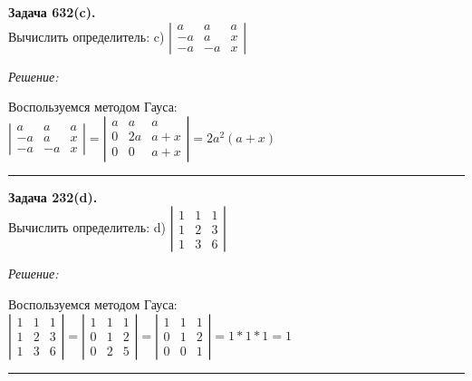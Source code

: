 \documentclass[a4paper, 12pt]{article}
\newenvironment{problem}[2][Задача]
    { \begin{mdframed}[backgroundcolor=gray!10] \textbf{#1 #2.} \\}
    {  \end{mdframed}}
\newenvironment{solution}
    {\textit{Решение: }}
    {\noindent\rule{7in}{1.5pt}}
\begin{document}
\begin{problem}{632(c)}
Вычислить определитель:
c) $\left| \begin{array}{rrr}a & a & a \\ -a & a & x\\-a & -a & x \end{array} \right|$
\end{problem}
\begin{solution}

Воспользуемся методом Гауса: \\
$
\left|
\begin{array}{rrr}
  a & a & a \\
  -a & a & x \\
  -a & -a & x
\end{array}
\right|
=
\left|
\begin{array}{rrr}
  a & a & a \\
  0 & 2a & a + x \\
  0 & 0 & a + x
\end{array}
\right|
=
2a^2(a + x)
$

\end{solution}

\begin{problem}{232(d)}
Вычислить определитель:
d) $\left| \begin{array}{rrr}1 & 1 & 1 \\ 1 & 2 & 3 \\ 1 & 3 & 6 \end{array} \right|$
\end{problem}
\begin{solution}

Воспользуемся методом Гауса: \\
$
\left|
\begin{array}{rrr}
  1 & 1 & 1 \\
  1 & 2 & 3 \\
  1 & 3 & 6
\end{array}
\right|
=
\left|
\begin{array}{rrr}
  1 & 1 & 1 \\
  0 & 1 & 2 \\
  0 & 2 & 5
\end{array}
\right|
=
\left|
\begin{array}{rrr}
  1 & 1 & 1 \\
  0 & 1 & 2 \\
  0 & 0 & 1
\end{array}
\right|
= 1 * 1 * 1 = 1
$


\end{solution}
\end{document}
